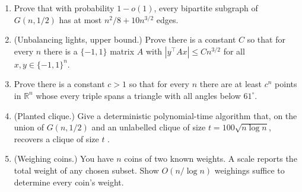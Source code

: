 \begin{enumerate}[itemsep=4pt]
  \item Prove that with probability $1-o(1)$, every bipartite subgraph of
        $G(n,1/2)$ has at most $n^2/8+10n^{3/2}$ edges.
  \item (Unbalancing lights, upper bound.) Prove there is a constant $C$ so that
        for every $n$ there is a $\{-1,1\}$ matrix $A$ with
        $|y^\top A x|\le Cn^{3/2}$ for all $x,y\in\{-1,1\}^n$.
  \item Prove there is a constant $c>1$ so that for every $n$ there are at least
        $c^n$ points in $\mathbb R^n$ whose every triple spans a triangle with all
        angles below $61^\circ$.
  \item (Planted clique.) Give a deterministic polynomial-time algorithm that,
        on the union of $G(n,1/2)$ and an unlabelled clique of size
        $t=100\sqrt{n\log n}$, recovers a clique of size $t$ \whp.
  \item (Weighing coins.) You have $n$ coins of two known weights. A scale reports
        the total weight of any chosen subset. Show $O(n/\log n)$ weighings suffice
        to determine every coin's weight.
\end{enumerate}
